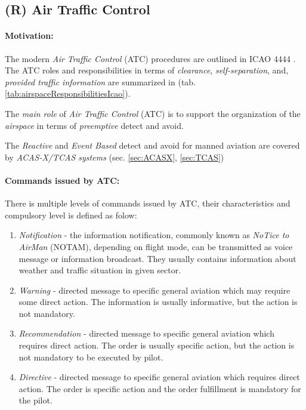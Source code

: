 \setcounter{chapter}{6}
\setcounter{section}{7}
\setcounter{subsection}{3}

\subsection{(R) Air Traffic Control}\label{sec:AirTrafficControl}
\paragraph{Motivation:} The modern \emph{Air Traffic Control} (ATC) procedures are outlined in ICAO 4444 \cite{icao4444}. The ATC roles and responsibilities in terms of \emph{clearance}, \emph{self-separation}, and, \emph{provided traffic information} are summarized in (tab. \ref{tab:airspaceResponsibilitiesIcao}). 

The \emph{main role} of \emph{Air Traffic Control} (ATC) is to support the organization of the \emph{airspace} in terms of \emph{preemptive} detect and avoid.

\begin{note}
    The \emph{Reactive} and \emph{Event Based} detect and avoid for manned aviation are covered by \emph{ACAS-X/TCAS systems} (sec. \ref{sec:ACASX}, \ref{sec:TCAS})
\end{note}

\paragraph{Commands issued by ATC:} There is multiple levels of commands issued by ATC, their characteristics and compulsory level is defined as folow:

\begin{enumerate}
    \item \emph{Notification} - the information notification, commonly known as \emph{NoTice to AirMan} (NOTAM), depending on flight mode, can be transmitted as voice message or information broadcast. They usually contains information about weather and traffic situation in given sector.
    
    \item \emph{Warning} - directed message to specific general aviation  which may require some direct action. The information is usually informative, but the action is not mandatory.
    
    \item \emph{Recommendation} - directed message to specific general aviation  which requires direct action. The order is usually specific action, but the action is not mandatory to be executed by pilot.
    
    \item \emph{Directive} - directed message to specific general aviation  which requires direct action. The order is specific action and the order fulfillment is mandatory for the pilot. 
\end{enumerate}

